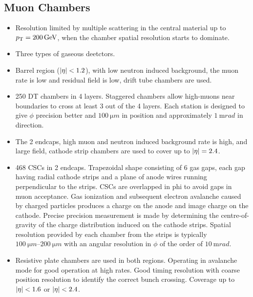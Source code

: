 \subsection{Muon Chambers}

\begin{itemize}
    \item Resolution limited by multiple scattering in the central material
        up to $p_{\text{T}}=\SI{200}{GeV}$, when the chamber spatial resolution starts
        to dominate.
    \item Three types of gaseous deetctors.
    \item Barrel region (${|\eta|<1.2}$), with low neutron induced background,
        the muon rate is low and residual field is low, drift tube chambers are
        used.
    \item 250 DT chambers in 4 layers. Staggered chambers allow high-\pt muons
        near boundaries to cross at least 3 out of the 4 layers. Each station is
        designed to give $\phi$ precision better and ${\SI{100}{\micro m}}$ in
        position and approximately ${\SI{1}{\milli rad}}$ in direction.
    \item The 2 endcaps, high muon and neutron induced background rate is high,
        and large field, cathode strip chambers are used to cover up to
        ${{|\eta|}=2.4}$.
    \item 468 CSCs in 2 endcaps. Trapezoidal shape consisting of 6 gas gaps,
        each gap having radial cathode strips and a plane of anode wires running
        perpendicular to the strips. CSCs are overlapped in phi to avoid gaps
        in muon acceptance. Gas ionization and subsequent electron avalanche
        caused by charged particles produces a charge on the anode and image
        charge on the cathode. Precise precision measurement is made by
        determining the centre-of-gravity of the charge distribution induced on
        the cathode strips. Spatial resolution provided by each chamber from the
        strips is typically ${\SIrange{100}{200}{\micro m}}$ with an angular
        resolution in $\phi$ of the order of ${\SI{10}{\milli rad}}$.
    \item Resistive plate chambers are used in both regions. Operating
        in avalanche mode for good operation at high rates. Good timing
        resolution with coarse position resolution to identify the correct
        bunch crossing. Coverage up to ${|\eta|<1.6}$ or ${|\eta|<2.4}$.
\end{itemize}

